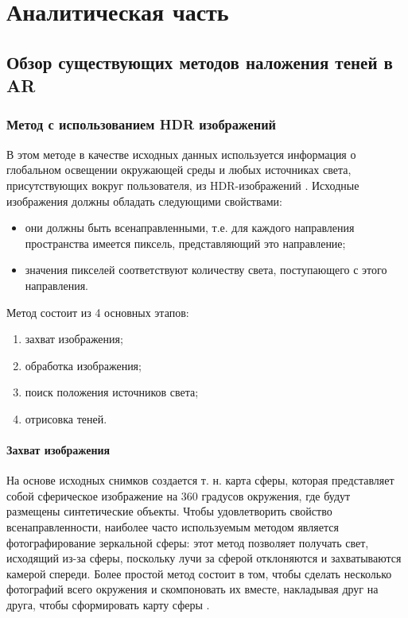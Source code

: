 \chapter{Аналитическая часть}


\section{Обзор существующих методов наложения теней в AR}

\subsection{Метод с использованием HDR изображений}

В этом методе в качестве исходных данных используется информация о глобальном освещении окружающей среды и любых источниках света, присутствующих вокруг пользователя, из HDR-изображений \cite{hdri, rtsm}. Исходные изображения должны обладать следующими свойствами:

\begin{itemize}
	\item они должны быть всенаправленными, т.е. для каждого направления пространства имеется пиксель, представляющий это направление;
	\item значения пикселей соответствуют количеству света, поступающего с этого направления.
\end{itemize}

Метод состоит из 4 основных этапов:

\begin{enumerate}
	\item захват изображения;
	\item обработка изображения;
	\item поиск положения источников света;
	\item отрисовка теней.
\end{enumerate}

\subsubsection*{Захват изображения}

На основе исходных снимков создается т. н. карта сферы, которая представляет собой сферическое изображение на 360 градусов окружения, где будут размещены синтетические объекты. Чтобы удовлетворить свойство всенаправленности, наиболее часто используемым методом является фотографирование зеркальной сферы: этот метод позволяет получать свет, исходящий из-за сферы, поскольку лучи за сферой отклоняются и захватываются камерой спереди. Более простой метод состоит в том, чтобы сделать несколько фотографий всего окружения и скомпоновать их вместе, накладывая друг на друга, чтобы сформировать карту сферы \cite{rtsm}.

